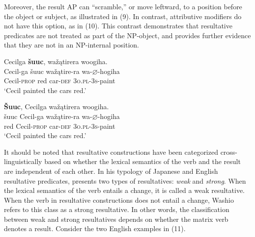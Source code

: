 \documentclass[output=paper]{LSP/langsci}
\begin{document}
Moreover, the result AP can ``scramble,'' or move leftward, to a position before the object or subject, as illustrated in (9). In contrast, attributive modifiers do not have this option, as in (10). This contrast demonstrates that resultative predicates are not treated as part of the NP-object, and provides further evidence that they are not in an NP-internal position.

\begin{exe}
\ex
\begin{xlist}

\ex \glll Cecilga \textbf{šuuc}, wažątirera woogiha. \\
 Cecil-ga šuuc  wažątire-ra wa-{$\varnothing$}-hogiha\\
 Cecil-\textsc{prop} red car-\textsc{def} \textsc{3o.pl}-\textsc{3s}-paint \\
\glt `Cecil painted the cars red.'

\ex \glll \textbf{\v{S}uuc}, Cecilga wažątirera woogiha. \\
  šuuc Cecil-ga wažątire-ra wa-{$\varnothing$}-hogiha\\
red Cecil-\textsc{prop} car-\textsc{def} \textsc{3o.pl}-\textsc{3s}-paint \\
\glt `Cecil painted the cars red.'

\end{xlist}




\end{exe}

It should be noted that resultative constructions have been categorized cross-linguistically based on whether the lexical semantics of the verb and the result are independent of each other. In his typology of Japanese and English resultative predicates, \citet{Washio1997} presents two types of resultatives: \textit{weak} and \textit{strong}. When the lexical semantics of the verb entails a change, it is called a weak resultative. When the verb in resultative constructions does not entail a change, Washio refers to this class as a strong resultative. In other words, the classification between weak and strong resultatives depends on whether the matrix verb denotes a result. Consider the two English examples in (11).
\end{document}
